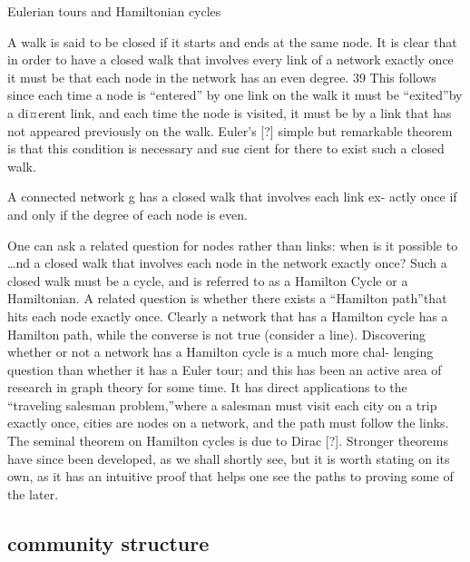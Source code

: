 Eulerian tours and Hamiltonian cycles

A walk is said to be closed if it starts and ends at the same node. It is clear that in
order to have a closed walk that involves every link of a network exactly once it must
be that each node in the network has an even degree. 39 This follows since each time a
node is “entered” by one link on the walk it must be “exited”by a di¤erent link, and
each time the node is visited, it must be by a link that has not appeared previously on
the walk. Euler’s [?] simple but remarkable theorem is that this condition is necessary
and su¢ cient for there to exist such a closed walk.

A connected network g has a closed walk that involves each link ex-
actly once if and only if the degree of each node is even.


One can ask a related question for nodes rather than links: when is it possible to
…nd a closed walk that involves each node in the network exactly once? Such a closed
walk must be a cycle, and is referred to as a Hamilton Cycle or a Hamiltonian. A
related question is whether there exists a “Hamilton path”that hits each node exactly
once. Clearly a network that has a Hamilton cycle has a Hamilton path, while the
converse is not true (consider a line).
Discovering whether or not a network has a Hamilton cycle is a much more chal-
lenging question than whether it has a Euler tour; and this has been an active area
of research in graph theory for some time. It has direct applications to the “traveling
salesman problem,”where a salesman must visit each city on a trip exactly once, cities
are nodes on a network, and the path must follow the links.
The seminal theorem on Hamilton cycles is due to Dirac [?]. Stronger theorems
have since been developed, as we shall shortly see, but it is worth stating on its own,
as it has an intuitive proof that helps one see the paths to proving some of the later. 


\subsection{community structure}

